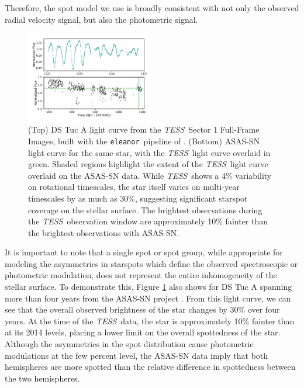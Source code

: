 \documentclass[twocolumn]{aastex63}
\newcommand{\tess}{{\it TESS}}
\newcommand{\eleanor}{\texttt{eleanor}}
\begin{document}
Therefore, the spot model we use is broadly consistent with not only the observed radial velocity signal, but also the photometric signal.


\begin{figure}[!tbh]
  \begin{center}
    \includegraphics[width=0.5\textwidth, trim={0cm 0.0cm 0cm 0cm}, clip=true]{../figures/lcs.pdf}
   \end{center}
  \caption{(Top) DS Tuc A light curve from the \tess\ Sector 1 Full-Frame Images, built with the \eleanor\ pipeline of \citet{Feinstein19}. (Bottom) ASAS-SN light curve for the same star, with the \tess\ light curve overlaid in green. Shaded regions highlight the extent of the \tess\ light curve overlaid on the ASAS-SN data. While \tess\ shows a 4\% variability on rotational timescales, the star itself varies on multi-year timescales by as much as 30\%, suggesting significant starspot coverage on the stellar surface. The brightest observations during the \tess\ observation window are approximately 10\% fainter than the brightest observations with ASAS-SN.}
  \label{fig:lc_data}
\end{figure}

It is important to note that a single spot or spot group, while appropriate for modeling the asymmetries in starspots which define the observed spectroscopic or photometric modulation, does not represent the entire inhomogeneity of the stellar surface. 
To demonstrate this, Figure \ref{fig:lc_data} also shows for DS Tuc A spanning more than four years from the ASAS-SN project \citep{Shappee14, Kochanek17}.
From this light curve, we can see that the overall observed brightness of the star changes by 30\% over four years. 
At the time of the \tess\ data, the star is approximately 10\% fainter than at its 2014 levels, placing a lower limit on the overall spottedness of the star. 
Although the asymmetries in the spot distribution cause photometric modulations at the few percent level, the ASAS-SN data imply that both hemispheres are more spotted than the relative difference in spottedness between the two hemispheres.
\end{document}
